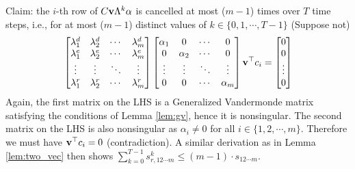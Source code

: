\documentclass[twocolumn]{autart}    %
\begin{document}
\begin{pf}
Claim: the $i$-th row of $C{\bf v}\Lambda^k \alpha$ is cancelled at most ($m-1$) times over $T$ time steps, i.e., for at most ($m-1$) distinct values of $k \in \{0, 1, \cdots, T-1\}$
(Suppose not)
\begin{equation}
\begin{aligned}
	&	%
		\begin{bmatrix} \lambda_1^d & \lambda_2^d & \cdots & \lambda_m^d \\
					\lambda_1^e & \lambda_2^e & \cdots & \lambda_m^e \\
					\vdots & \vdots & \ddots & \vdots \\
					\lambda_1^r& \lambda_2^r & \cdots & \lambda_m^r 
		\end{bmatrix} %
		\begin{bmatrix} \alpha_1 & 0 & \cdots & 0 \\ 0 & \alpha_2 & \cdots & 0 \\ 
					\vdots & \vdots & \ddots & \vdots \\
					0 & 0 & \cdots & \alpha_m \end{bmatrix} 
					{\bf v}^\top c_i 
		= \begin{bmatrix} 0 \\ 0 \\ \vdots \\ 0 \end{bmatrix} \nonumber\\
\end{aligned}
\end{equation}
Again, the first matrix on the LHS is a Generalized Vandermonde matrix satisfying the conditions of Lemma \ref{lem:gv}, hence it is nonsingular. The second matrix on the LHS is also nonsingular as $\alpha_i \neq 0$ for all $i \in \{1, 2, \cdots, m\}$. Therefore we must have ${\bf v}^\top c_i = 0$ (contradiction). A similar derivation as in Lemma \ref{lem:two_vec} then shows $\sum_{k=0}^{T-1} s_{r,12\cdots m}^ k \le (m-1) \cdot s_{12\cdots m}$.
\end{pf}
\end{document}
